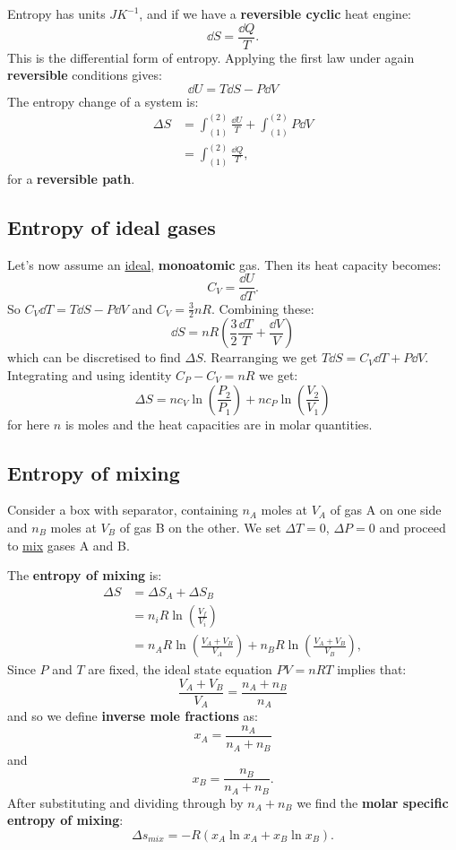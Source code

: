 \documentclass{article}
\begin{document}
Entropy has units $JK^{-1}$, and if we have a \textbf{reversible cyclic} heat engine:
$$\dd S=\frac{\dd Q}{T}.$$
This is the differential form of entropy. Applying the first law under again \textbf{reversible} conditions gives:
$$\dd U=T\dd S-P \dd V$$
The entropy change of a system is:
\begin{align*}
    \Delta S
    &=\int_{(1)}^{(2)}\frac{\dd U}{T}+\int_{(1)}^{(2)}P\dd V \\
    &=\int_{(1)}^{(2)}\frac{\dd Q}{T},
\end{align*}
for a \textbf{reversible path}.

\subsection{Entropy of ideal gases}
Let's now assume an \underline{ideal}, \textbf{monoatomic} gas. Then its heat capacity becomes:
$$C_V=\frac{\dd U}{\dd T}.$$
So $C_V \dd T=T\dd S-P\dd V$ and $C_V=\frac{3}{2}nR$. Combining these:
$$\dd S=nR\left(\frac{3}{2}\frac{\dd T}{T}+\frac{\dd V}{V}\right)$$
which can be discretised to find $\Delta S$. Rearranging we get $T\dd S=C_V \dd T+P \dd V$. Integrating and using identity $C_P-C_V=nR$ we get:
$$\Delta S=nc_V\ln\left(\frac{P_2}{P_1}\right)+nc_P\ln\left(\frac{V_2}{V_1}\right)$$
for here $n$ is moles and the heat capacities are in molar quantities.

\newpage

\subsection{Entropy of mixing}
Consider a box with separator, containing $n_A$ moles at $V_A$ of gas A on one side and $n_B$ moles at $V_B$ of gas B on the other. We set $\Delta T=0$, $\Delta P=0$ and proceed to \underline{mix} gases A and B.

The \textbf{entropy of mixing} is:
\begin{align*}
    \Delta S
    &=\Delta S_A+\Delta S_B \\
    &=n_i R\ln\left(\frac{V_f}{V_i}\right) \\
    &=n_A R\ln\left(\frac{V_A+V_B}{V_A}\right)
    +n_B R\ln\left(\frac{V_A+V_B}{V_B}\right),
\end{align*}
Since $P$ and $T$ are fixed, the ideal state equation $PV=nRT$ implies that:
$$\frac{V_A+V_B}{V_A}=\frac{n_A+n_B}{n_A}$$
and so we define \textbf{inverse mole fractions} as:
$$x_A=\frac{n_A}{n_A+n_B}$$
and
$$x_B=\frac{n_B}{n_A+n_B}.$$
After substituting and dividing through by $n_A+n_B$ we find the \textbf{molar specific entropy of mixing}:
$$\Delta s_{mix}=-R(x_A\ln x_A+x_B\ln x_B).$$
\end{document}
